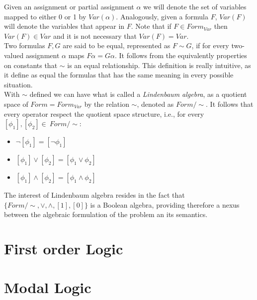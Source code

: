 Given an assignment or partial assignment $\alpha$ we will denote the set of variables mapped to either 0 or 1 by $Var(\alpha)$. Analogously, given a formula $F$, $Var(F)$ will denote the variables that appear in $F$. Note that if $F\in Form_{Var}$ then $Var(F)\in Var$ and it is not necessary that $Var(F)=Var$.\\


Two formulas $F,G$ are said to be equal, represented as $F\sim G$, if for every two-valued assignment $\alpha$ maps $F\alpha = G\alpha$. It follows from the equivalently properties on constants that $\sim$ is an equal relationship. This definition is really intuitive, as it define as equal the formulas that has the same meaning in every possible situation. \\



\label{def:linden}
With $\sim$ defined we can have what is called a \emph{Lindenbaum algebra}, as a quotient space of $Form = Form_{Var}$ by the relation $\sim$, denoted as $Form/\sim$. It follows that every operator respect the quotient space structure, i.e., for every $[\phi_1],[\phi_2]\in\ Form/\sim$:

\begin{itemize}
\item $\neg [\phi_1] = [\neg\phi_1]$
\item $ [\phi_1] \vee [\phi_2]= [\phi_1 \vee \phi_2]$
\item $ [\phi_1] \wedge [\phi_2]= [\phi_1 \wedge \phi_2]$
\end{itemize}

The interest of Lindenbaum algebra resides in the fact that $\{Form/\sim, \vee,\wedge,[1],[0]\}$ is a Boolean algebra, providing therefore a nexus between the algebraic formulation of the problem an its semantics.



\section{First order Logic}

\section{Modal Logic}















